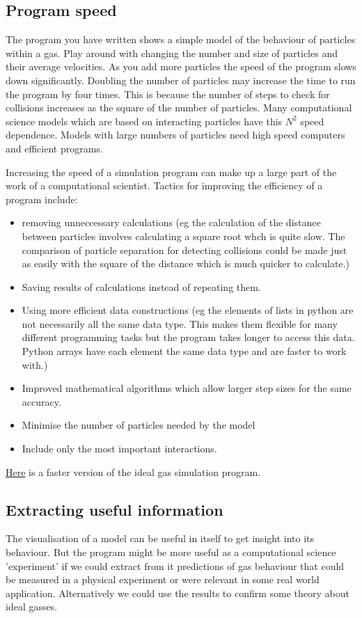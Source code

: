 \documentclass[a4paper]{letter}
\begin{document}
\subsection{Program speed}
The program you have written shows a simple model of the behaviour of particles within a gas. 
Play around with changing the number and size of particles and their average velocities. 
As you add more particles the speed of the program slows down significantly. 
Doubling the number of particles may increase the time to run the program by four times. 
This is because the number of steps to check for collisions increases as the square of the 
number of particles. 
Many computational science models which are based on interacting particles have this $N^2$ speed dependence.  
Models with large numbers of particles need high speed computers and efficient programs. 

Increasing the speed of a simulation program can make up a large part of the work of a 
computational scientist. 
Tactics for improving the efficiency of a program include:
\begin{itemize}
\item{removing unneccessary calculations (eg the calculation of the distance between particles involves calculating a square root whch is quite slow. The comparison of particle separation for detecting collisions could be made just as easily with the square of the distance which is much quicker to calculate.)}
\item{Saving results of calculations instead of repeating them. }
\item{Using more efficient data constructions (eg the elements of lists in python are not necessarily all the same data type. This makes them flexible for many different programming tasks but the program takes longer to access this data. Python arrays have each element the same data type and are faster to work with.) }
\item{Improved mathematical algorithms which allow larger step sizes for the same accuracy.}
\item{Minimise the number of particles needed by the model}
\item{Include only the most important interactions.} 
\end{itemize}

\href{quickbounce1.html}{Here} is a faster version of the ideal gas simulation program.

\subsection{Extracting useful information}
The visualisation of a model can be useful in itself to get insight into its behaviour. 
But the program might be more useful as a computational science 'experiment' if we 
could extract from it predictions of gas behaviour that could be measured in a 
physical experiment or were relevant in some real world application. 
Alternatively we could use the results to confirm some theory about ideal gasses. 
\end{document}
